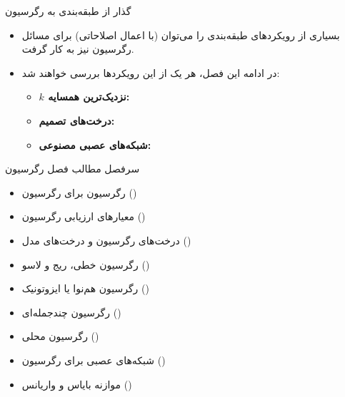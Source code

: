 \begin{frame}{گذار از طبقه‌بندی به رگرسیون}{}
  \begin{itemize}
    \setlength{\itemsep}{10pt}
    \item بسیاری از رویکردهای طبقه‌بندی را می‌توان (با اعمال اصلاحاتی) برای مسائل رگرسیون نیز به کار گرفت.
    \item در ادامه این فصل، هر یک از این رویکردها بررسی خواهند شد:
    \begin{itemize}
      \setlength{\itemsep}{8pt}
      \item \textbf{$k$ نزدیک‌ترین همسایه:} 
      \item \textbf{درخت‌های تصمیم:} 
      \item \textbf{شبکه‌های عصبی مصنوعی:} 
    \end{itemize}
  \end{itemize}
\end{frame}

\begin{frame}{سرفصل مطالب فصل رگرسیون}{}
  \begin{itemize}
    \setlength{\itemsep}{4pt}
    \item رگرسیون  برای رگرسیون ()
    \item معیارهای ارزیابی رگرسیون ()
    \item درخت‌های رگرسیون و درخت‌های مدل ()
    \item رگرسیون خطی، ریج و لاسو ()
    \item رگرسیون هم‌نوا یا ایزوتونیک ()
    \item رگرسیون چندجمله‌ای ()
    \item رگرسیون محلی ()
    \item شبکه‌های عصبی برای رگرسیون ()
    \item موازنه بایاس و واریانس ()
  \end{itemize}
\end{frame}

